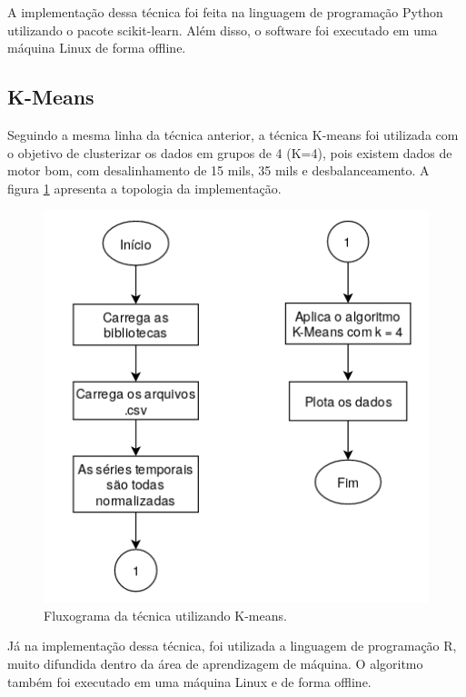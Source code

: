 A implementação dessa técnica foi feita na linguagem de programação Python utilizando o pacote scikit-learn. Além disso, o software foi 
executado em uma máquina Linux de forma offline.


%  

\subsection{K-Means}

Seguindo a mesma linha da técnica anterior, a técnica K-means foi utilizada com o objetivo de clusterizar os dados em grupos de 4 
(K=4), pois existem dados de motor bom, com desalinhamento de 15 mils, 35 mils e desbalanceamento. A figura \ref{fig:k-means} apresenta
a topologia da implementação.


\begin{figure}[H]
    \caption{Fluxograma da técnica utilizando K-means.}
    \begin{center}
        \includegraphics[scale=.65]{metodologia/img/k-means.png}
    \end{center}
    \label{fig:k-means}
\end{figure}

Já na implementação dessa técnica, foi utilizada a linguagem de programação R, muito difundida dentro da área de aprendizagem de máquina.
O algoritmo também foi executado em uma máquina Linux e de forma offline.


